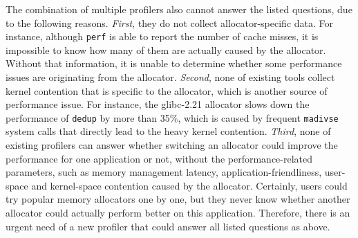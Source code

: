 The combination of multiple profilers also cannot answer the listed questions, due to the following reasons. \textit{First}, they do not collect allocator-specific data. For instance, although \texttt{perf} is able to report the number of cache misses, it is impossible to know how many of them are actually caused by the allocator. Without that information, it is unable to determine whether some performance issues are originating from the allocator. \textit{Second}, none of existing tools collect kernel contention that is specific to the allocator, which is another source of performance issue. For instance, the glibc-2.21 allocator slows down the performance of \texttt{dedup} by more than 35\%, which is caused by frequent \texttt{madivse} system calls that directly lead to the heavy kernel contention. \textit{Third}, none of existing profilers can answer whether switching an allocator could improve the performance for one application or not, without the performance-related parameters, such as memory management latency, application-friendliness, user-space and kernel-space contention caused by the allocator. Certainly, users could try popular memory allocators one by one,  but they never know whether another allocator could actually perform better on this application. Therefore, there is an urgent need of a new profiler that could answer all listed questions as above. 




